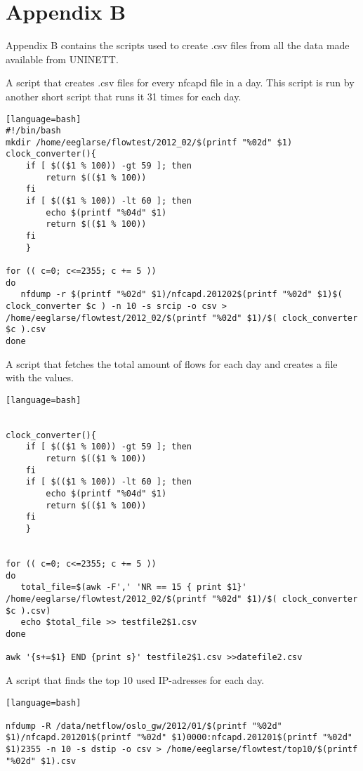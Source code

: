 \chapter{Appendix B}
\label{chp:appendixb} 
Appendix B contains the scripts used to create .csv files from all the data made available from UNINETT.

A script that creates .csv files for every nfcapd file in a day. This script is run by another short script that runs it 31 times for each day.
\begin{lstlisting}[caption={Creates .csv files for every nfcapd file in a day}][language=bash]
#!/bin/bash
mkdir /home/eeglarse/flowtest/2012_02/$(printf "%02d" $1)
clock_converter(){
	if [ $(($1 % 100)) -gt 59 ]; then
		return $(($1 % 100))
	fi
	if [ $(($1 % 100)) -lt 60 ]; then
		echo $(printf "%04d" $1)
		return $(($1 % 100))
	fi
	}

for (( c=0; c<=2355; c += 5 ))
do
   nfdump -r $(printf "%02d" $1)/nfcapd.201202$(printf "%02d" $1)$( clock_converter $c ) -n 10 -s srcip -o csv > /home/eeglarse/flowtest/2012_02/$(printf "%02d" $1)/$( clock_converter $c ).csv
done
\end{lstlisting}

A script that fetches the total amount of flows for each day and creates a file with the values.
\begin{lstlisting}[caption={Total amount of flows for each day}][language=bash]


clock_converter(){
	if [ $(($1 % 100)) -gt 59 ]; then
		return $(($1 % 100))
	fi
	if [ $(($1 % 100)) -lt 60 ]; then
		echo $(printf "%04d" $1)
		return $(($1 % 100))
	fi
	}


for (( c=0; c<=2355; c += 5 ))
do
   total_file=$(awk -F',' 'NR == 15 { print $1}' /home/eeglarse/flowtest/2012_02/$(printf "%02d" $1)/$( clock_converter $c ).csv)
   echo $total_file >> testfile2$1.csv
done

awk '{s+=$1} END {print s}' testfile2$1.csv >>datefile2.csv

\end{lstlisting}
A script that finds the top 10 used IP-adresses for each day. 
\begin{lstlisting}[caption={Top 10 used IP-adresses for each day}][language=bash]

nfdump -R /data/netflow/oslo_gw/2012/01/$(printf "%02d" $1)/nfcapd.201201$(printf "%02d" $1)0000:nfcapd.201201$(printf "%02d" $1)2355 -n 10 -s dstip -o csv > /home/eeglarse/flowtest/top10/$(printf "%02d" $1).csv
\end{lstlisting}

